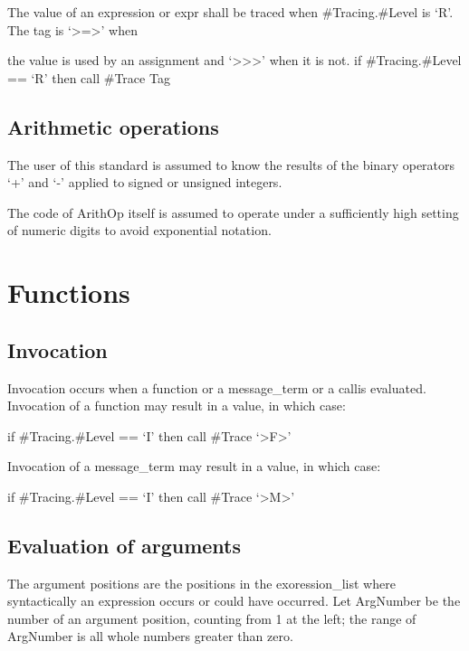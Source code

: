 The value of an expression or expr shall be traced when
\#Tracing.\#Level is `R'. The tag is `\textgreater=\textgreater{}' when

the value is used by an assignment and
`\textgreater\textgreater\textgreater{}' when it is not. if
\#Tracing.\#Level == `R' then call \#Trace Tag

\subsection{Arithmetic operations}\label{arithmetic-operations}

The user of this standard is assumed to know the results of the binary
operators `+' and `-' applied to signed or unsigned integers.

The code of ArithOp itself is assumed to operate under a sufficiently
high setting of numeric digits to avoid exponential notation.


\section{Functions}\label{functions}

\subsection{Invocation}\label{invocation}

Invocation occurs when a function or a message\_term or a callis
evaluated. Invocation of a function may result in a value, in which
case:

if \#Tracing.\#Level == `I' then call \#Trace
`\textgreater F\textgreater{}'

Invocation of a message\_term may result in a value, in which case:

if \#Tracing.\#Level == `I' then call \#Trace
`\textgreater M\textgreater{}'

\subsection{Evaluation of arguments}\label{evaluation-of-arguments}

The argument positions are the positions in the exoression\_list where
syntactically an expression occurs or could have occurred. Let ArgNumber
be the number of an argument position, counting from 1 at the left; the
range of ArgNumber is all whole numbers greater than zero.

